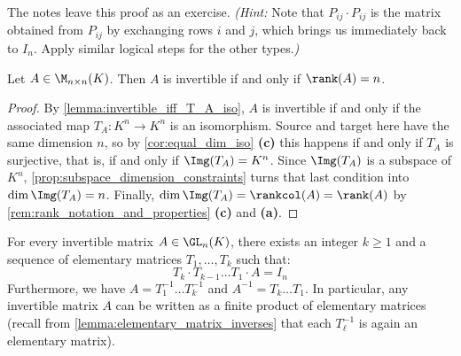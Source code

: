 \begin{exercise}
\label{exc:elementary_matrix_inverses}
The notes leave this proof as an exercise. \textit{(Hint:} Note that $P_{ij} \cdot P_{ij}$ is the matrix obtained from $P_{ij}$ by exchanging rows $i$ and $j$, which brings us immediately back to $I_n$. Apply similar logical steps for the other types.\textit{)}
\end{exercise}

\begin{aiproposition}
\label{aiprop:invertible_iff_full_rank}
Let $A \in \M_{n \times n}(K)$. Then $A$ is invertible if and only if $\rank(A) = n$.
\end{aiproposition}

\begin{proof}
By \cref{lemma:invertible_iff_T_A_iso}, $A$ is invertible if and only if the associated map $T_A: K^n \to K^n$ is an isomorphism. Source and target here have the same dimension $n$, so by \cref{cor:equal_dim_iso} \textbf{(c)} this happens if and only if $T_A$ is surjective, that is, if and only if $\Img(T_A) = K^n$. Since $\Img(T_A)$ is a subspace of $K^n$, \cref{prop:subspace_dimension_constraints} turns that last condition into $\dim \Img(T_A) = n$. Finally, $\dim \Img(T_A) = \rankcol(A) = \rank(A)$ by \cref{rem:rank_notation_and_properties} \textbf{(c)} and \textbf{(a)}.
\end{proof}

\begin{theorem}
\label{thm:elementary_matrix_decomposition}
For every invertible matrix $A \in \GL_n(K)$, there exists an integer $k \ge 1$ and a sequence of elementary matrices $T_1, \dots, T_k$ such that:
\begin{equation*}
    T_k \cdot T_{k-1} \dots T_1 \cdot A = I_n
\end{equation*}
Furthermore, we have $A = T_1^{-1} \dots T_k^{-1}$ and $A^{-1} = T_k \dots T_1$. In particular, any invertible matrix $A$ can be written as a finite product of elementary matrices (recall from \cref{lemma:elementary_matrix_inverses} that each $T_{\ell}^{-1}$ is again an elementary matrix).
\end{theorem}

